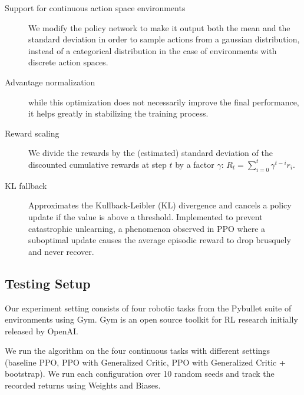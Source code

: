 \begin{description}
\item[Support for continuous action space environments] %
 We modify the policy network to make it output both the mean and the standard deviation in order to sample actions from a gaussian distribution, instead of a categorical distribution in the case of environments with discrete action spaces.
 
\item[Advantage normalization] while this optimization does not necessarily improve the final performance\cite{andrychowicz2020learning}, it helps greatly in stabilizing the training process.
\item[Reward scaling] We divide the rewards by the (estimated) standard deviation of the discounted cumulative rewards at step $t$ by a factor $\gamma$: $R_t = \sum_{i=0}^t \gamma^{t-i} r_i$. %
\item[KL fallback] Approximates the Kullback-Leibler (KL) divergence and cancels a policy update if the value is above a threshold. Implemented to prevent catastrophic unlearning\cite{dossa2021empirical}, a phenomenon observed in PPO where a suboptimal update causes the average episodic reward to drop brusquely and never recover.
\end{description}

\subsection{Testing Setup}

Our experiment setting consists of four robotic tasks from the Pybullet suite of environments using Gym. Gym\cite{brockman2016openai} is an open source toolkit for RL research initially released by OpenAI. 

We run the algorithm on the four continuous tasks with different settings (baseline PPO, PPO with Generalized Critic, PPO with Generalized Critic + bootstrap). We run each configuration over 10 random seeds and track the recorded returns using Weights and Biases\cite{wandb}.

